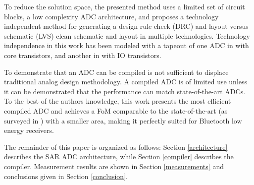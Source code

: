 To reduce the solution space, the presented method uses a limited set of circuit blocks, a low
complexity ADC architecture, and proposes a technology
independent method for generating a design rule check (DRC) and layout
versus schematic (LVS) clean schematic and layout in multiple
technologies. Technology independence in this work has been
modeled with a tapeout of one ADC in {\technm} with
core transistors, and another in {\technm} with IO transistors.

To demonstrate that an ADC can be compiled is not sufficient to
displace traditional analog design methodology. A compiled ADC is of
limited use unless it can be demonstrated that the performance can match
state-of-the-art ADCs.
To the best of
the authors knowledge, this work presents
the most efficient compiled ADC and achieves a FoM comparable to the
state-of-the-art \cite{harpe12,patil16,liu16}  (as surveyed in
\cite{murmann16}) with a smaller area, making it
perfectly suited for Bluetooth\textsuperscript{\textregistered} low
energy receivers.


The remainder of this paper is organized as follows: Section \ref{architecture}  describes the
SAR ADC architecture, while Section \ref{compiler} describes the
compiler.  Measurement results are shown in Section \ref{measurements}
and conclusions given in Section \ref{conclusion}.




